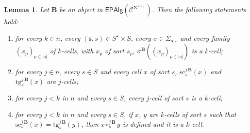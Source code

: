 \documentclass[a4paper, reqno]{amsbook}
\newcommand{\bb}[1]{\ensuremath{\lvert #1 \rvert}}
\newcommand{\sig}[1]{\mathbf{#1}}             %
\newcommand{\spec}[1]{\boldsymbol{\mathcal{#1}}} %
\newcommand{\src}{\mathrm{sc}}
\newcommand{\tgt}{\mathrm{tg}}
\theoremstyle{plain}
\newtheorem{lemma}[theorem]{Lemma}
\theoremstyle{definition}
\begin{document}
\begin{lemma}\label{LGdCells}
Let $\mathbf{B}$ be an object in $\mathsf{EPAlg}(\spec{C}^{\sig{\Sigma}^{(n)}})$.
Then the following statements hold:
\begin{enumerate}
\item for every $k\in n$, every $(\mathbf{s},s)\in S^{\star}\times S$, every $\sigma\in\Sigma_{\mathbf{s},s}$ and every family $(x_{p})_{p\in\bb{\mathbf{s}}}$ of $k$-cells, with $x_{p}$ of sort $s_{p}$, $\sigma^{\mathbf{B}}((x_{p})_{p\in\bb{\mathbf{s}}})$ is a $k$-cell;
\item for every $j\in n$, every $s\in S$ and every cell $x$ of sort $s$, $\src^{j\,\mathbf{B}}_{s}(x)$ and $\tgt^{j\,\mathbf{B}}_{s}(x)$ are $j$-cells;
\item for every $j<k$ in $n$ and every $s\in S$, every $j$-cell of sort $s$ is a $k$-cell;
\item for every $j<k$ in $n$ and every $s\in S$, if $x$, $y$ are $k$-cells of sort $s$ such that $\src^{j\,\mathbf{B}}_{s}(x)=\tgt^{j\,\mathbf{B}}_{s}(y)$, then $x\circ^{j\,\mathbf{B}}_{s}y$ is defined and it is a $k$-cell.
\end{enumerate}
\end{lemma}
\end{document}
